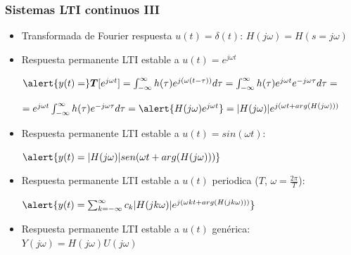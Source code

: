 
\begin{frame}\frametitle{Sistemas LTI continuos III}\small
  \begin{figure}\centering\small
  \end{figure}
  \begin{itemize}\footnotesize
    \item Transformada  de Fourier respuesta $u(t)=\delta(t)$: $H(j\omega)=H(s=j\omega)$
    \item Respuesta permanente LTI estable a $u(t)=e^{j\omega t}$
    
    \footnotesize
    $\alert{y(t)=}\bm{T}[e^{j\omega t}]=\int_{-\infty}^\infty h(\tau)e^{j(\omega(t-\tau))}d\tau=\int_{-\infty}^\infty h(\tau)e^{j\omega t}e^{-j\omega\tau}d\tau=$

    \hspace{0.6cm}	 $=e^{j\omega t} \int_{-\infty}^\infty h(\tau)e^{-j\omega\tau}d\tau=\alert{H(j\omega)e^{j\omega t}}=|H(j\omega)|e^{j(\omega t+arg(H(j\omega)))}$
    \item Respuesta permanente LTI estable a $u(t)=sin(\omega t)$:

    $\alert{y(t)=|H(j\omega)|sen(\omega t+arg(H(j\omega)))}$
    \item Respuesta permanente LTI estable a $u(t)$ periodica ($T$, $\omega=\frac{2\pi}{T}$):

    $\alert{y(t)=\sum_{k=-\infty}^{\infty} c_k |H(jk\omega)|e^{j(\omega kt+arg(H(jk\omega)))}}$
    \item Respuesta permanente  LTI estable a $u(t)$ gen\'{e}rica: $Y(j\omega)=H(j\omega)U(j\omega)$
  \end{itemize}
\end{frame}



